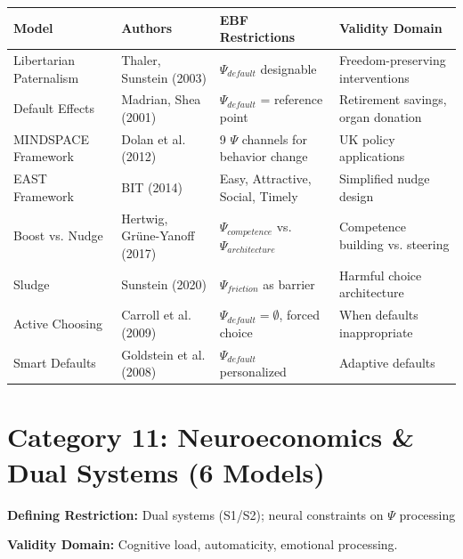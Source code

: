 \small
\begin{longtable}{@{}p{3cm}p{2.5cm}p{4cm}p{4cm}@{}}
\toprule
\textbf{Model} & \textbf{Authors} & \textbf{EBF Restrictions} & \textbf{Validity Domain} \\
\midrule
\endhead

Libertarian Paternalism & Thaler, Sunstein (2003) &
$\Psi_{default}$ designable &
Freedom-preserving interventions \\

Default Effects & Madrian, Shea (2001) &
$\Psi_{default}$ = reference point &
Retirement savings, organ donation \\

MINDSPACE Framework & Dolan et al. (2012) &
9 $\Psi$ channels for behavior change &
UK policy applications \\

EAST Framework & BIT (2014) &
Easy, Attractive, Social, Timely &
Simplified nudge design \\

Boost vs. Nudge & Hertwig, Grüne-Yanoff (2017) &
$\Psi_{competence}$ vs. $\Psi_{architecture}$ &
Competence building vs. steering \\

Sludge & Sunstein (2020) &
$\Psi_{friction}$ as barrier &
Harmful choice architecture \\

Active Choosing & Carroll et al. (2009) &
$\Psi_{default} = \emptyset$, forced choice &
When defaults inappropriate \\

Smart Defaults & Goldstein et al. (2008) &
$\Psi_{default}$ personalized &
Adaptive defaults \\

\bottomrule
\end{longtable}
\normalsize

\section{Category 11: Neuroeconomics \& Dual Systems (6 Models)}
\label{sec:ms-neuro}

\begin{tcolorbox}[colback=gray!5!white, colframe=gray!75!black,
    title=\textbf{Neuroeconomics: The Neural Implementation Extension}]

\textbf{Defining Restriction:} Dual systems (S1/S2); neural constraints on $\Psi$ processing

\textbf{Validity Domain:} Cognitive load, automaticity, emotional processing.

\end{tcolorbox}

